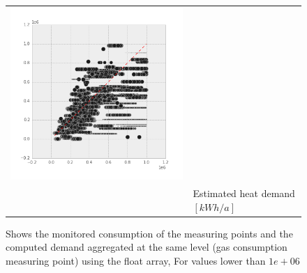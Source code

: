 \begin{figure}[htb]
\begin{tabular}{lccc}
 \includegraphics[width= 0.28\linewidth]{FIGURES/EcoFYS_06}\\
&\multicolumn{3}{l}{Estimated heat demand $[kWh/a]$}\\

\end{tabular}	
    \caption[Consumption vs. demand with float array]{Shows the monitored
        consumption of the measuring points and the computed demand aggregated
        at the same level (gas consumption measuring point) using the float
        array, For values lower than $1e+06$}\label{fig:con_dem_W06}
\end{figure}

